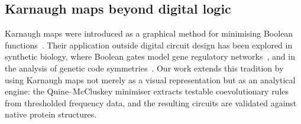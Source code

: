 \subsection{Karnaugh maps beyond digital logic}
Karnaugh maps were introduced as a graphical method for minimising Boolean
functions~\cite{karnaugh1953}.  Their application outside digital circuit
design has been explored in synthetic biology, where Boolean gates model gene
regulatory networks~\cite{marchisio2011}, and in the analysis of genetic code
symmetries~\cite{petoukhov2025}.  Our work extends this tradition by using
Karnaugh maps not merely as a visual representation but as an analytical
engine: the Quine--McCluskey minimiser extracts testable coevolutionary rules
from thresholded frequency data, and the resulting circuits are validated
against native protein structures.
